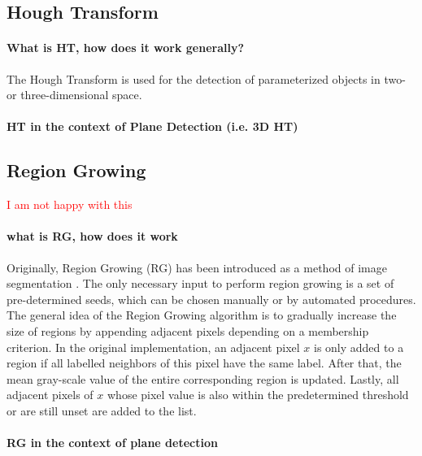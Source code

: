 \documentclass[main.tex]{subfiles}
\begin{document}
\subsection*{Hough Transform}
\paragraph{What is HT, how does it work generally?}
The Hough Transform is used for the detection of parameterized objects in two- or three-dimensional space.
\paragraph{HT in the context of Plane Detection (i.e. 3D HT)}
\subsection*{Region Growing}
\textcolor{red}{I am not happy with this}
\paragraph{what is RG, how does it work}
Originally, Region Growing (RG) has been introduced as a method of image segmentation \cite{Adams_Bischof_1994}. The only necessary input to perform region growing is a set of pre-determined seeds, which can be chosen manually or by automated procedures. The general idea of the Region Growing algorithm is to gradually increase the size of regions by appending adjacent pixels depending on a membership criterion. In the original implementation, an adjacent pixel $x$ is only added to a region if all labelled neighbors of this pixel have the same label. After that, the mean gray-scale value of the entire corresponding region is updated. Lastly, all adjacent pixels of $x$ whose pixel value is also within the predetermined threshold or are still unset are added to the list.   

\paragraph{RG in the context of plane detection}
\end{document}
